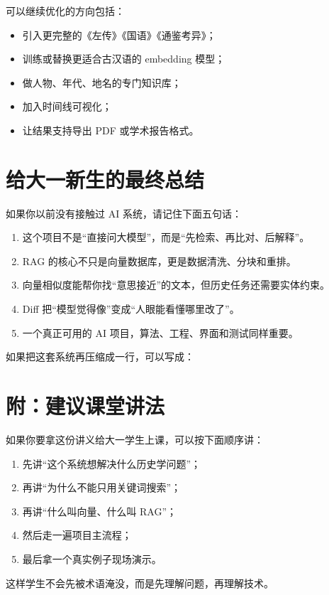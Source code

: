 \documentclass[12pt,a4paper]{ctexart}
\begin{document}
可以继续优化的方向包括：

\begin{itemize}
  \item 引入更完整的《左传》《国语》《通鉴考异》；
  \item 训练或替换更适合古汉语的 embedding 模型；
  \item 做人物、年代、地名的专门知识库；
  \item 加入时间线可视化；
  \item 让结果支持导出 PDF 或学术报告格式。
\end{itemize}

\section{给大一新生的最终总结}

如果你以前没有接触过 AI 系统，请记住下面五句话：

\begin{enumerate}
  \item 这个项目不是“直接问大模型”，而是“先检索、再比对、后解释”。
  \item RAG 的核心不只是向量数据库，更是数据清洗、分块和重排。
  \item 向量相似度能帮你找“意思接近”的文本，但历史任务还需要实体约束。
  \item Diff 把“模型觉得像”变成“人眼能看懂哪里改了”。
  \item 一个真正可用的 AI 项目，算法、工程、界面和测试同样重要。
\end{enumerate}

如果把这套系统再压缩成一行，可以写成：

\begin{center}
\end{center}

\section*{附：建议课堂讲法}

如果你要拿这份讲义给大一学生上课，可以按下面顺序讲：

\begin{enumerate}
  \item 先讲“这个系统想解决什么历史学问题”；
  \item 再讲“为什么不能只用关键词搜索”；
  \item 再讲“什么叫向量、什么叫 RAG”；
  \item 然后走一遍项目主流程；
  \item 最后拿一个真实例子现场演示。
\end{enumerate}

这样学生不会先被术语淹没，而是先理解问题，再理解技术。
\end{document}
